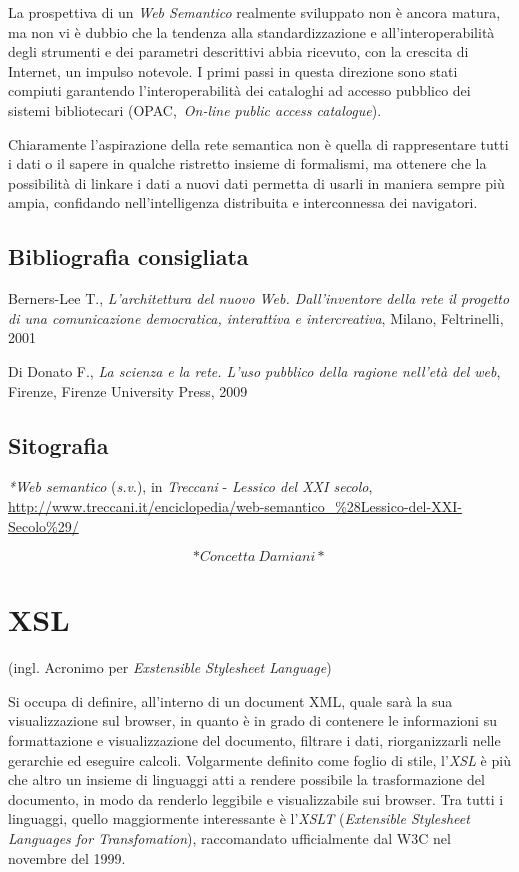 \documentclass[
  b5paper,
  twoside,
  12pt,
  chapterprefix=false,
  bibliography=totocnumbered,
  parskip=false]{scrbook}
\begin{document}
La prospettiva di un \emph{Web Semantico} realmente sviluppato non è ancora
matura, ma non vi è dubbio che la tendenza alla standardizzazione e
all'interoperabilità degli strumenti e dei parametri descrittivi abbia
ricevuto, con la crescita di Internet, un impulso notevole. I primi
passi in questa direzione sono stati compiuti garantendo
l'interoperabilità dei cataloghi ad accesso pubblico dei sistemi
bibliotecari (OPAC,~\emph{On-line public access catalogue}).

Chiaramente l'aspirazione della rete semantica non è quella di
rappresentare tutti i dati o il sapere in qualche ristretto insieme di
formalismi, ma ottenere che la possibilità di linkare i dati a nuovi
dati permetta di usarli in maniera sempre più ampia, confidando
nell'intelligenza distribuita e interconnessa dei navigatori.

\hypertarget{bibliografia-consigliata-26}{%
\section*{Bibliografia consigliata}\label{bibliografia-consigliata-26}}

Berners-Lee T., \emph{L'architettura del nuovo Web. Dall'inventore della
rete il progetto di una comunicazione democratica, interattiva e
intercreativa}, Milano, Feltrinelli, 2001

Di Donato F., \emph{La scienza e la rete. L'uso pubblico della ragione
nell'età del web}, Firenze, Firenze University Press, 2009

\hypertarget{sitografia-34}{%
\section*{Sitografia}\label{sitografia-34}}

\emph{*Web semantico} (\emph{s.v}.), in \emph{Treccani} - \emph{Lessico del XXI secolo},
\url{http://www.treccani.it/enciclopedia/web-semantico_\%28Lessico-del-XXI-Secolo\%29/}

\[*Concetta~Damiani*\]

\hypertarget{xsl}{%
\chapter{XSL}\label{xsl}}

(ingl. Acronimo per \emph{Exstensible Stylesheet Language})

Si occupa di definire, all'interno di un document XML, quale sarà la sua
visualizzazione sul browser, in quanto è in grado di contenere le
informazioni su formattazione e visualizzazione del documento, filtrare
i dati, riorganizzarli nelle gerarchie ed eseguire calcoli. Volgarmente
definito come foglio di stile, l'\emph{XSL} è più che altro un insieme di
linguaggi atti a rendere possibile la trasformazione del documento, in
modo da renderlo leggibile e visualizzabile sui browser. Tra tutti i
linguaggi, quello maggiormente interessante è l'\emph{XSLT} (\emph{Extensible
Stylesheet Languages for Transfomation}), raccomandato ufficialmente dal
W3C nel novembre del 1999.
\end{document}
